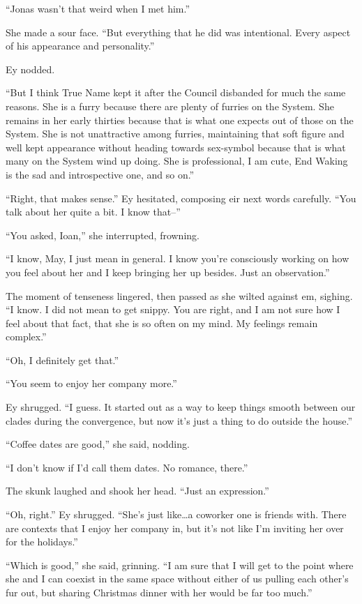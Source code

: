 ``Jonas wasn't that weird when I met him.''

She made a sour face. ``But everything that he did was intentional. Every aspect of his appearance and personality.''

Ey nodded.

``But I think True Name kept it after the Council disbanded for much the same reasons. She is a furry because there are plenty of furries on the System. She remains in her early thirties because that is what one expects out of those on the System. She is not unattractive among furries, maintaining that soft figure and well kept appearance without heading towards sex-symbol because that is what many on the System wind up doing. She is professional, I am cute, End Waking is the sad and introspective one, and so on.''

``Right, that makes sense.'' Ey hesitated, composing eir next words carefully. ``You talk about her quite a bit. I know that--''

``You asked, Ioan,'' she interrupted, frowning.

``I know, May, I just mean in general. I know you're consciously working on how you feel about her and I keep bringing her up besides. Just an observation.''

The moment of tenseness lingered, then passed as she wilted against em, sighing. ``I know. I did not mean to get snippy. You are right, and I am not sure how I feel about that fact, that she is so often on my mind. My feelings remain complex.''

``Oh, I definitely get that.''

``You seem to enjoy her company more.''

Ey shrugged. ``I guess. It started out as a way to keep things smooth between our clades during the convergence, but now it's just a thing to do outside the house.''

``Coffee dates are good,'' she said, nodding.

``I don't know if I'd call them dates. No romance, there.''

The skunk laughed and shook her head. ``Just an expression.''

``Oh, right.'' Ey shrugged. ``She's just like\ldots a coworker one is friends with. There are contexts that I enjoy her company in, but it's not like I'm inviting her over for the holidays.''

``Which is good,'' she said, grinning. ``I am sure that I will get to the point where she and I can coexist in the same space without either of us pulling each other's fur out, but sharing Christmas dinner with her would be far too much.''

